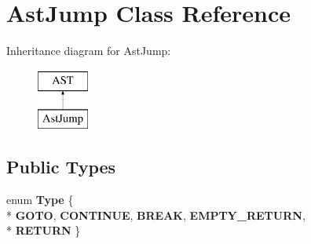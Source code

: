 \hypertarget{classAstJump}{\section{Ast\-Jump Class Reference}
\label{classAstJump}
}
Inheritance diagram for Ast\-Jump\-:\begin{figure}[H]
\begin{center}
\leavevmode
\includegraphics[height=2.000000cm]{classAstJump}
\end{center}
\end{figure}
\subsection*{Public Types}
\begin{DoxyCompactItemize}
\item 
enum {\bfseries Type} \{ \\*
{\bfseries G\-O\-T\-O}, 
{\bfseries C\-O\-N\-T\-I\-N\-U\-E}, 
{\bfseries B\-R\-E\-A\-K}, 
{\bfseries E\-M\-P\-T\-Y\-\_\-\-R\-E\-T\-U\-R\-N}, 
\\*
{\bfseries R\-E\-T\-U\-R\-N}
 \}
\end{DoxyCompactItemize}
